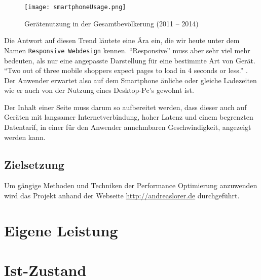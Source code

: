 	\begin{figure}[htbp]
		\begin{center}
			\texttt{[image: smartphoneUsage.png]}
		\end{center}
		\caption{Gerätenutzung in der Gesamtbevölkerung (2011 – 2014)\autocite{tns14}}
		\label{fig:geraetenutzung}
	\end{figure}

	Die Antwort auf diesen Trend läutete eine Ära ein, die wir heute unter dem Namen \texttt{Responsive Webdesign} kennen. "`Responsive"' muss aber sehr viel mehr bedeuten, als nur eine angepasste Darstellung für eine bestimmte Art von Gerät. "`Two out of three mobile shoppers expect pages to load in 4 seconds or less."' \autocite{radware13}. Der Anwender erwartet also auf dem Smartphone änliche oder gleiche Ladezeiten wie er auch von der Nutzung eines Desktop-Pc's gewohnt ist.

	Der Inhalt einer Seite muss darum so aufbereitet werden, dass dieser auch auf Geräten mit langsamer Internetverbindung, hoher Latenz und einem begrenzten Datentarif, in einer für den Anwender annehmbaren Geschwindigkeit, angezeigt werden kann.\\



\subsection{Zielsetzung} %
\label{sub:zielsetzung}
	Um gängige Methoden und Techniken der Performance Optimierung anzuwenden wird das Projekt anhand der Webseite \url{http://andreaslorer.de} durchgeführt.




\section{Eigene Leistung} %
\label{sub:eigene_leistung}




\section{Ist-Zustand} %
\label{sec:Ist-Zustand}


